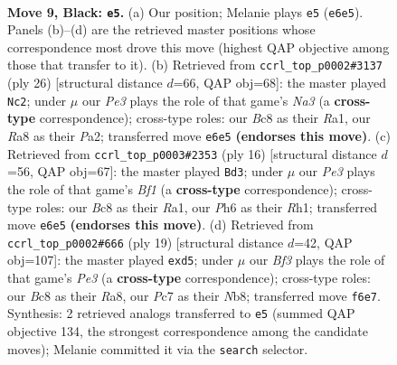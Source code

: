 \documentclass[11pt]{article}
\begin{document}
\clearpage

\begin{figure}[p]\centering
\begin{subfigure}{0.46\textwidth}\centering
\resizebox{\linewidth}{!}{%
\newchessgame
\chessboard[
  setfen={rnbq1rk1/ppp2pp1/4pb1p/8/2pP2PP/2N1PN2/PP3P2/R2QKB1R b KQ - 0 9},
  showmover=false,
  pgfstyle=straightmove, color=movearrow, markmove={e6-e5}
]}
\caption{}
\end{subfigure}\hfill
\begin{subfigure}{0.46\textwidth}\centering
\resizebox{\linewidth}{!}{%
\newchessgame
\chessboard[
  setfen={r2qk2r/1p3pp1/p1n1p3/2Ppnb1p/8/N1P1B3/PP2BPPP/R2Q1RK1 w kq - 0 14},
  showmover=false,
  pgfstyle=straightmove, color=movearrow, markmove={a3-c2}
]}
\caption{}
\end{subfigure}
\\[4pt]
\begin{subfigure}{0.46\textwidth}\centering
\resizebox{\linewidth}{!}{%
\newchessgame
\chessboard[
  setfen={r2qkb1r/pp3ppp/2n1pn2/3p4/3P4/2N1PQ2/PP1B1PPP/R3KB1R w KQkq - 0 9},
  showmover=false,
  pgfstyle=straightmove, color=movearrow, markmove={f1-d3}
]}
\caption{}
\end{subfigure}\hfill
\begin{subfigure}{0.46\textwidth}\centering
\resizebox{\linewidth}{!}{%
\newchessgame
\chessboard[
  setfen={rn1q1rk1/pbp2pp1/1p2pb1p/3P4/3P4/P1N1PN2/1P3PPP/2RQKB1R b K - 0 10},
  showmover=false,
  pgfstyle=straightmove, color=movearrow, markmove={e6-d5}
]}
\caption{}
\end{subfigure}
\caption{\textbf{Move 9, Black: \texttt{e5}.} (a) Our position; Melanie plays \texttt{e5} (\texttt{e6e5}). Panels (b)--(d) are the retrieved master positions whose correspondence most drove this move (highest QAP objective among those that transfer to it). (b) Retrieved from \texttt{ccrl\_top\_p0002\#3137} (ply 26) [structural distance $d$=66, QAP obj=68]: the master played \texttt{Nc2}; under $\mu$ our \emph{Pe3} plays the role of that game's \emph{Na3} (a \textbf{cross-type} correspondence); cross-type roles: our \emph{B}c8 as their \emph{R}a1, our \emph{R}a8 as their \emph{P}a2; transferred move \texttt{e6e5} \textbf{(endorses this move)}. (c) Retrieved from \texttt{ccrl\_top\_p0003\#2353} (ply 16) [structural distance $d$=56, QAP obj=67]: the master played \texttt{Bd3}; under $\mu$ our \emph{Pe3} plays the role of that game's \emph{Bf1} (a \textbf{cross-type} correspondence); cross-type roles: our \emph{B}c8 as their \emph{R}a1, our \emph{P}h6 as their \emph{R}h1; transferred move \texttt{e6e5} \textbf{(endorses this move)}. (d) Retrieved from \texttt{ccrl\_top\_p0002\#666} (ply 19) [structural distance $d$=42, QAP obj=107]: the master played \texttt{exd5}; under $\mu$ our \emph{Bf3} plays the role of that game's \emph{Pe3} (a \textbf{cross-type} correspondence); cross-type roles: our \emph{B}c8 as their \emph{R}a8, our \emph{P}c7 as their \emph{N}b8; transferred move \texttt{f6e7}. Synthesis: 2 retrieved analogs transferred to \texttt{e5} (summed QAP objective 134, the strongest correspondence among the candidate moves); Melanie committed it via the \texttt{search} selector.}
\label{fig:thought-m17}
\end{figure}
\end{document}
